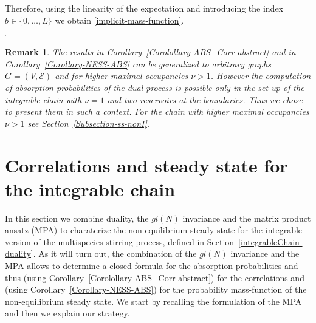 \documentclass[10pt]{article}
\numberwithin{equation}{section}
\numberwithin{equation}{subsection}
\newtheorem{remark}{Remark}
\begin{document}
Therefore, using the linearity of the expectation and introducing the index $b\in \{0,\ldots,L\}$ we obtain \eqref{implicit-mass-function}. 
\begin{flushright}
	$\square$
\end{flushright}
\begin{remark}\label{Remark-extension-graph-nu}
	The results in Corollary~\ref{Corolollary-ABS_Corr-abstract} and in Corollary~\ref{Corollary-NESS-ABS}  can be generalized to arbitrary graphs $G=(V,\mathcal{E})$ and for higher maximal occupancies $\nu >1$.
	However the computation of absorption probabilities of the dual process is possible only in the set-up of the integrable chain with $\nu =1$ and two reservoirs at the boundaries.
	Thus we chose to present them in such a context. For the chain with higher maximal occupancies $\nu >1$ see Section~\ref{Subsection-ss-nonI}.
\end{remark}





\section{Correlations and steady state  for the integrable chain}\label{sectionIntegrabiliy}
In this section we combine duality, the $gl(N)$ invariance and the matrix product ansatz (MPA) to charaterize the non-equilibrium steady state for the integrable version of the multispecies stirring process, defined in Section~\ref{integrableChain-duality}. 
As it will turn out, the combination of the $gl(N)$ invariance  and the MPA allows to determine a closed formula for the absorption probabilities and thus (using Corollary~\ref{Corolollary-ABS_Corr-abstract}) for the correlations
and (using Corollary~\ref{Corollary-NESS-ABS}) for the probability mass-function of the non-equilibrium steady state.
We start by recalling the formulation of the MPA  and then we explain our strategy.
\end{document}
